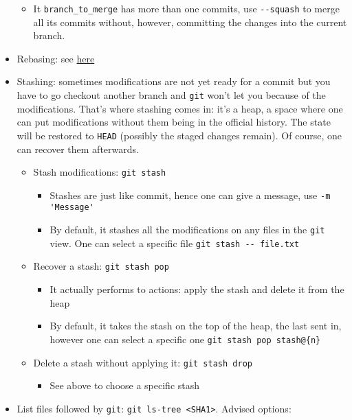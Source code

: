 \documentclass[a4paper,12pt,%
              final%
              ]{article}
\begin{document}
\begin{itemize}
\begin{itemize}
      \item It \verb|branch_to_merge| has more than one commits, use \verb|--squash| to merge all its commits without, however, committing the changes into the current branch.
    \end{itemize}
  \item Rebasing: see \href{https://git-scm.com/book/en/v2/Git-Branching-Rebasing}{here}
  \item Stashing: sometimes modifications are not yet ready for a commit but you have to go checkout another branch and \texttt{git} won't let you because of the modifications. That's where stashing comes in: it's a heap, a space where one can put modifications without them being in the official history. The state will be restored to \texttt{HEAD} (possibly the staged changes remain). Of course, one can recover them afterwards.
    \begin{itemize}
      \item Stash modifications: \texttt{git stash}
        \begin{itemize}
          \item Stashes are just like commit, hence one can give a message, use \verb|-m 'Message'|
          \item By default, it stashes all the modifications on any files in the \texttt{git} view. One can select a specific file \verb|git stash -- file.txt|
        \end{itemize}
      \item Recover a stash: \texttt{git stash pop}
        \begin{itemize}
          \item It actually performs to actions: apply the stash and delete it from the heap
          \item By default, it takes the stash on the top of the heap, the last sent in, however one can select a specific one \verb|git stash pop stash@{n}|
        \end{itemize}
      \item Delete a stash without applying it: \texttt{git stash drop}
        \begin{itemize}
          \item See above to choose a specific stash
        \end{itemize}
    \end{itemize}
  \item List files followed by \texttt{git}: \verb|git ls-tree <SHA1>|. Advised options:
    \begin{itemize}

\end{itemize}
\end{itemize}
\end{document}
